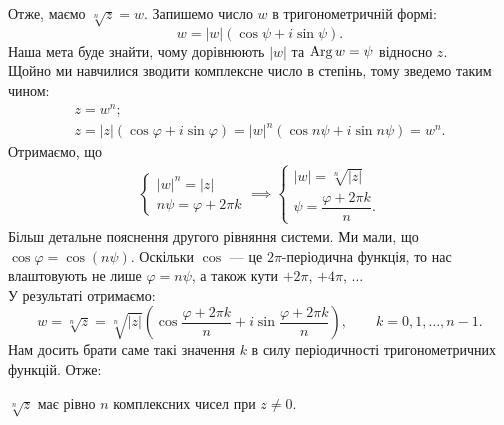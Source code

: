 \documentclass{math_library}
\begin{document}
Отже, маємо $\sqrt[n]{z} = w$. Запишемо число $w$ в тригонометричній формі:
\[
w = |w|(\cos \psi + i \sin \psi).
\]
Наша мета буде знайти, чому дорівнюють $|w|$ та $\operatorname{Arg} w = \psi$ відносно $z$.\\
Щойно ми навчилися зводити комплексне число в степінь, тому зведемо таким чином:
\begin{align*}
z = w^n; \\
z = |z|(\cos \varphi + i \sin \varphi) = |w|^n (\cos n \psi + i \sin n \psi) = w^n.
\end{align*}
Отримаємо, що
\begin{align*}
\begin{cases} |w|^n = |z| \\ n \psi = \varphi + 2 \pi k \end{cases} \implies \begin{cases} |w| = \sqrt[n]{|z|} \\ \psi = \dfrac{\varphi + 2\pi k}{n}. \end{cases}
\end{align*}
Більш детальне пояснення другого рівняння системи. Ми мали, що $\cos \varphi = \cos (n \psi)$. Оскільки $\cos$ --- це $2\pi$-періодична функція, то нас влаштовують не лише $\varphi = n \psi$, а також кути $+2\pi$, $+4\pi$, $\dots$\\
У результаті отримаємо:
\[
w = \sqrt[n]{z} = \sqrt[n]{|z|} \left(\cos \dfrac{\varphi + 2\pi k}{n} + i \sin \dfrac{\varphi + 2 \pi k}{n} \right), \qquad k = 0,1,\dots,n-1.
\]
Нам досить брати саме такі значення $k$ в силу періодичності тригонометричних функцій. Отже:

\begin{proposition}
$\sqrt[n]{z}$ має рівно $n$ комплексних чисел при $z \neq 0$.
\end{proposition}
\end{document}
